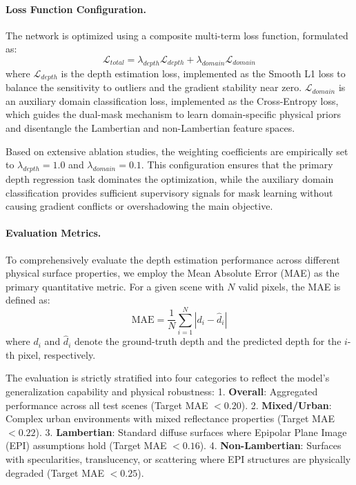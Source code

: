 \paragraph{Loss Function Configuration.}
The network is optimized using a composite multi-term loss function, formulated as:
\begin{equation}
\label{eq:eq9}
\mathcal{L}_{total} = \lambda_{depth} \mathcal{L}_{depth} + \lambda_{domain} \mathcal{L}_{domain}
\end{equation}
where $\mathcal{L}_{depth}$ is the depth estimation loss, implemented as the Smooth L1 loss to balance the sensitivity to outliers and the gradient stability near zero. $\mathcal{L}_{domain}$ is an auxiliary domain classification loss, implemented as the Cross-Entropy loss, which guides the dual-mask mechanism to learn domain-specific physical priors and disentangle the Lambertian and non-Lambertian feature spaces. 

Based on extensive ablation studies, the weighting coefficients are empirically set to $\lambda_{depth} = 1.0$ and $\lambda_{domain} = 0.1$. This configuration ensures that the primary depth regression task dominates the optimization, while the auxiliary domain classification provides sufficient supervisory signals for mask learning without causing gradient conflicts or overshadowing the main objective.

\paragraph{Evaluation Metrics.}
To comprehensively evaluate the depth estimation performance across different physical surface properties, we employ the Mean Absolute Error (MAE) as the primary quantitative metric. For a given scene with $N$ valid pixels, the MAE is defined as:
\begin{equation}
\label{eq:eq10}
\text{MAE} = \frac{1}{N} \sum_{i=1}^{N} |d_i - \hat{d}_i|
\end{equation}
where $d_i$ and $\hat{d}_i$ denote the ground-truth depth and the predicted depth for the $i$-th pixel, respectively. 

The evaluation is strictly stratified into four categories to reflect the model's generalization capability and physical robustness: 
1. \textbf{Overall}: Aggregated performance across all test scenes (Target MAE $< 0.20$).
2. \textbf{Mixed/Urban}: Complex urban environments with mixed reflectance properties (Target MAE $< 0.22$).
3. \textbf{Lambertian}: Standard diffuse surfaces where Epipolar Plane Image (EPI) assumptions hold (Target MAE $< 0.16$).
4. \textbf{Non-Lambertian}: Surfaces with specularities, translucency, or scattering where EPI structures are physically degraded (Target MAE $< 0.25$).

